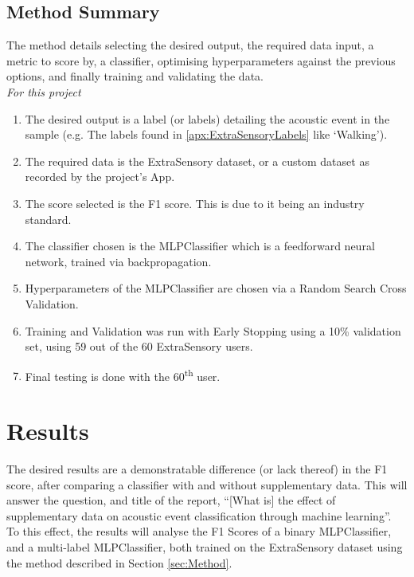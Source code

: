 \documentclass{UoNMCHA}
\newcommand{\inlineQuote}[1]{``#1''}
\numberwithin{equation}{section}
\begin{document}

\subsection{Method Summary}

The method details selecting the desired output, the required data input, a metric to score by, a classifier, optimising hyperparameters against the previous options, and finally training and validating the data. \\

{\itshape For this project}
\begin{enumerate}
    \item The desired output is a label (or labels) detailing the acoustic event in the sample (e.g. The labels found in \ref{apx:ExtraSensoryLabels} like `Walking').
    \item The required data is the ExtraSensory dataset, or a custom dataset as recorded by the project's App.
    \item The score selected is the F1 score. This is due to it being an industry standard.
    \item The classifier chosen is the MLPClassifier which is a feedforward neural network, trained via backpropagation.
    \item Hyperparameters of the MLPClassifier are chosen via a Random Search Cross Validation.
    \item Training and Validation was run with Early Stopping using a 10\% validation set, using 59 out of the 60 ExtraSensory users.
    \item Final testing is done with the 60\textsuperscript{th} user.
\end{enumerate}


\clearpage \section{Results} \label{sec:Results}

The desired results are a demonstratable difference (or lack thereof) in the F1 score, after comparing a classifier with and without supplementary data.
This will answer the question, and title of the report, \inlineQuote{[What is] the  effect of supplementary data on acoustic event classification through machine learning}. To this effect, the results will analyse the F1 Scores of a binary MLPClassifier, and a multi-label MLPClassifier, both trained on the ExtraSensory dataset using the method described in Section \ref{sec:Method}.
\end{document}
